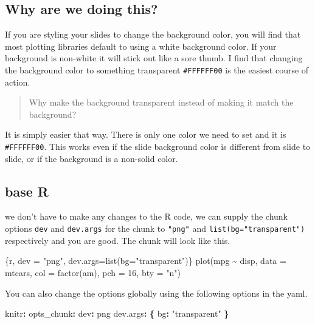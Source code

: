\documentclass[
  letterpaper,
  DIV=11,
  numbers=noendperiod]{scrreprt}
\newenvironment{Shaded}{\begin{snugshade}}{\end{snugshade}}
\newcommand{\AttributeTok}[1]{\textcolor[rgb]{0.40,0.45,0.13}{#1}}
\newcommand{\FunctionTok}[1]{\textcolor[rgb]{0.28,0.35,0.67}{#1}}
\newcommand{\InformationTok}[1]{\textcolor[rgb]{0.37,0.37,0.37}{#1}}
\newcommand{\KeywordTok}[1]{\textcolor[rgb]{0.00,0.23,0.31}{\textbf{#1}}}
\newcommand{\StringTok}[1]{\textcolor[rgb]{0.13,0.47,0.30}{#1}}
\begin{document}
\subsection{Why are we doing this?}\label{why-are-we-doing-this}

If you are styling your slides to change the background color, you will
find that most plotting libraries default to using a white background
color. If your background is non-white it will stick out like a sore
thumb. I find that changing the background color to something
transparent \texttt{\#FFFFFF00} is the easiest course of action.

\begin{quote}
Why make the background transparent instead of making it match the
background?
\end{quote}

It is simply easier that way. There is only one color we need to set and
it is \texttt{\#FFFFFF00}. This works even if the slide background color
is different from slide to slide, or if the background is a non-solid
color.

\subsection{base R}\label{base-r}

we don't have to make any changes to the R code, we can supply the chunk
options \texttt{dev} and \texttt{dev.args} for the chunk to
\texttt{"png"} and \texttt{list(bg="transparent")} respectively and you
are good. The chunk will look like this.

\begin{Shaded}
\begin{Highlighting}[]
\InformationTok{\textasciigrave{}\textasciigrave{}\textasciigrave{}\{r, dev = "png", dev.args=list(bg="transparent")\}}
\InformationTok{plot(mpg \textasciitilde{} disp, data = mtcars, col = factor(am), pch = 16, bty = "n")}
\InformationTok{\textasciigrave{}\textasciigrave{}\textasciigrave{}}
\end{Highlighting}
\end{Shaded}

You can also change the options globally using the following options in
the yaml.

\begin{Shaded}
\begin{Highlighting}[]
\FunctionTok{knitr}\KeywordTok{:}
\AttributeTok{  }\FunctionTok{opts\_chunk}\KeywordTok{:}
\AttributeTok{    }\FunctionTok{dev}\KeywordTok{:}\AttributeTok{ png}
\AttributeTok{    }\FunctionTok{dev.args}\KeywordTok{:}\AttributeTok{ }\KeywordTok{\{}\AttributeTok{ }\FunctionTok{bg}\KeywordTok{:}\AttributeTok{ }\StringTok{"transparent"}\AttributeTok{ }\KeywordTok{\}}
\end{Highlighting}
\end{Shaded}
\end{document}
